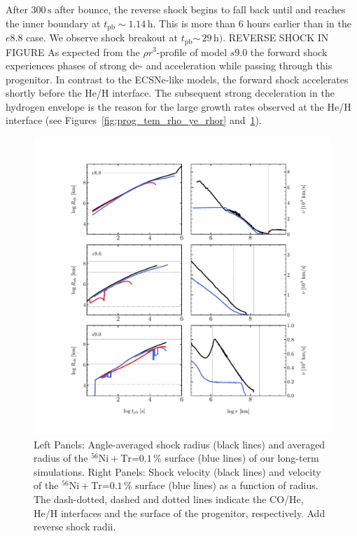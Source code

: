 \documentclass[fleqn,usenatbib]{mnras}
\newcommand{\tpb}{\ensuremath{t_{\text{pb}}}}
\newcommand{\nickel}{\ensuremath{\mathrm{^{56}Ni}}\xspace}
\newcommand{\tracer}{\ensuremath{\mathrm{Tr}}\xspace}
\newcommand{\s}{\ensuremath{\text{s}}}
\newcommand{\COM}[1]{{\color{orange}#1}}
\begin{document}
After $300\,\s$ after bounce, the reverse shock begins to fall back until and reaches the inner boundary at $t_{\mathrm{pb}}\sim 1.14\,\text{h}$. This is more than 6 hours earlier than in the $e8.8$ case. We observe shock breakout at $\tpb\mathord{\sim}\, 29\,\mathrm{h})$. \COM{REVERSE SHOCK IN FIGURE}
As expected from the $\rho r^3$-profile of model $s9.0$ the forward shock experiences phases of strong de- and acceleration while passing through this progenitor. In contrast to the ECSNe-like models, the forward shock accelerates shortly before the He/H interface. The subsequent strong deceleration in the hydrogen envelope is the reason for the large growth rates observed at the He/H interface (see Figures~\ref{fig:prog_tem_rho_ye_rhor} and~\ref{fig:radii all times}). 

\begin{figure}
 \centering
 \includegraphics[width=\textwidth, trim=0cm 1.0cm 0cm 1.0cm,clip]{pic/radii_velocity_shock_nickel.pdf}
 \caption{Left Panels: Angle-averaged shock radius (black lines) and averaged radius of the $\nickel+\tracer\mathord{=}0.1\,\%$ surface (blue lines) of our long-term simulations. Right Panels: Shock velocity (black lines) and velocity of the $\nickel+\tracer\mathord{=}0.1\,\%$ surface (blue lines) as a function of radius. The dash-dotted, dashed and dotted lines indicate the CO/He, He/H interfaces and the surface of the progenitor, respectively. \COM{Add reverse shock radii.}}
 \label{fig:radii all times}
\end{figure}
\end{document}
